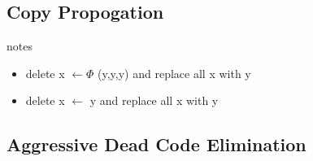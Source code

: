 



\subsection{Copy Propogation}

\begin{note}{notes}
	\begin{itemize}
		\item  delete x $\gets \Phi$ (y,y,y) and replace all x with y
		\item delete x $\gets$ y and replace all x with y
	\end{itemize}
\end{note}



\subsection{Aggressive Dead Code Elimination}

